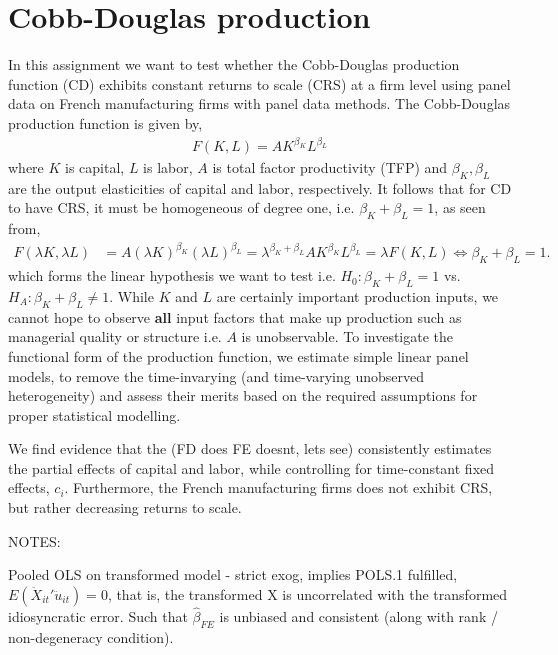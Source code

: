 \section{Cobb-Douglas production} \label{sec:intro}

In this assignment we want to test whether the Cobb-Douglas production function (CD) exhibits constant returns to scale (CRS) at a firm level using panel data on French manufacturing firms with panel data methods. The Cobb-Douglas production function is given by,
\begin{align} \label{eq:CD}
    F(K,L) = A K^{\beta_K} L^{\beta_L}
\end{align}
where $K$ is capital, $L$ is labor, $A$ is total factor productivity (TFP) and $\beta_K, \beta_L$ are the output elasticities of capital and labor, respectively.
It follows that for CD to have CRS, it must be homogeneous of degree one, i.e. $\beta_K + \beta_L = 1$, as seen from,
\begin{align*} 
    F(\lambda K, \lambda L) &= A (\lambda K)^{\beta_K} (\lambda L)^{\beta_L} = \lambda^{\beta_K + \beta_L} A K^{\beta_K} L^{\beta_L} = \lambda F(K,L) \iff \beta_K + \beta_L = 1.
\end{align*} 
which forms the linear hypothesis we want to test i.e. $H_0: \beta_K + \beta_L = 1$ vs. $H_A: \beta_K + \beta_L \neq 1$.
While $K$ and $L$ are certainly important production inputs, we cannot hope to observe \textbf{all} input factors that make up production such as managerial quality or structure i.e. $A$ is unobservable. To investigate the functional form of the production function, we estimate simple linear panel models, to remove the time-invarying (and time-varying unobserved heterogeneity) and assess their merits based on the required assumptions for proper statistical modelling.

We find evidence that the (FD does FE doesnt, lets see) consistently estimates the partial effects of capital and labor, while controlling for time-constant fixed effects, $c_i$. Furthermore, the French manufacturing firms does not exhibit CRS, but rather decreasing returns to scale. 

NOTES: 

Pooled OLS on transformed model -\> strict exog, implies POLS.1 fulfilled, $E(\ddot{X}_{it}' \ddot{u}_{it}) = 0$, that is, the transformed X is uncorrelated with the transformed idiosyncratic error. Such that $\hat{\beta}_{FE}$ is unbiased and consistent (along with rank / non-degeneracy condition). 

